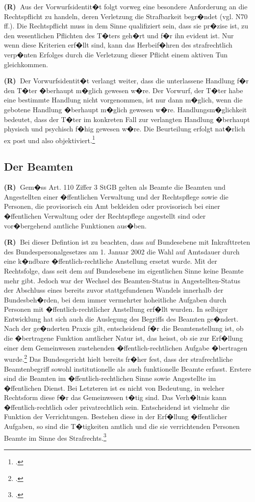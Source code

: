 \documentclass[paper=a4,fontsize=12pt, oneside, numbers=noenddot]{scrbook}
\newcounter{rz}
\newcommand{\Rz}{\addtocounter{rz}{1}\textbf{(R\arabic{rz})~}}
\begin{document}
	\Rz Aus der Vorwurfsidentit�t folgt vorweg eine besondere Anforderung an die Rechtspflicht zu handeln, deren Verletzung die Strafbarkeit begr�ndet (vgl. N70 ff.). Die Rechtspflicht muss in dem Sinne qualifiziert sein, dass sie pr�zise ist, zu den wesentlichen Pflichten des T�ters geh�rt und f�r ihn evident ist. Nur wenn diese Kriterien erf�llt sind, kann das Herbeif�hren des strafrechtlich verp�nten Erfolges durch die Verletzung dieser Pflicht einem aktiven Tun gleichkommen.

\Rz Der Vorwurfsidentit�t verlangt weiter, dass die unterlassene Handlung f�r den T�ter �berhaupt m�glich gewesen w�re. Der Vorwurf, der T�ter habe eine bestimmte Handlung nicht vorgenommen, ist nur dann m�glich, wenn die gebotene Handlung �berhaupt m�glich gewesen w�re. Handlungsm�glichkeit bedeutet, dass der T�ter im konkreten Fall zur verlangten Handlung �berhaupt physisch und psychisch f�hig gewesen w�re. Die Beurteilung erfolgt nat�rlich ex post und also objektiviert.\footcite[Art. 11, Rz 120]{2019:Niggli:BSKStGB}



	
	\subsection{Der Beamten}\label{Recht:Beamte}
	\Rz Gem�ss Art. 110 Ziffer 3 StGB gelten als Beamte die Beamten und Angestellten einer �ffentlichen Verwaltung und der Rechtspflege sowie die Personen, die provisorisch ein Amt bekleiden oder provisorisch bei einer �ffentlichen Verwaltung oder der Rechtspflege angestellt sind oder vor�bergehend amtliche Funktionen aus�ben. 
	
	\Rz Bei dieser Defintion ist zu beachten, dass auf Bundesebene mit Inkrafttreten des Bundespersonalgesetzes am 1. Januar 2002 die Wahl auf Amtsdauer durch eine k�ndbare �ffentlich-rechtliche Anstellung ersetzt wurde. Mit der Rechtsfolge, dass seit dem auf Bundesebene im eigentlichen Sinne keine Beamte mehr gibt. Jedoch war der Wechsel des Beamten-Status in Angestellten-Status der Abschluss eines bereits zuvor stattgefundenen Wandels innerhalb der Bundesbeh�rden, bei dem immer vermehrter hoheitliche Aufgaben durch Personen mit �ffentlich-rechtlicher Anstellung erf�llt wurden. In selbiger Entwicklung hat sich auch die Auslegung des Begriffs des Beamten ge�ndert. Nach der ge�nderten Praxis gilt, entscheidend f�r die Beamtenstellung ist, ob die �bertragene Funktion amtlicher Natur ist, das heisst, ob sie zur Erf�llung einer dem Gemeinwesen zustehenden �ffentlich-rechtlichen Aufgabe �bertragen wurde.\footcite[Erw. 1.3]{BGE141IV329} Das Bundesgericht hielt bereits fr�her fest, dass der strafrechtliche Beamtenbegriff sowohl institutionelle als auch funktionelle Beamte erfasst. Erstere sind die Beamten im �ffentlich-rechtlichen Sinne sowie Angestellte im �ffentlichen Dienst. Bei Letzteren ist es nicht von Bedeutung, in welcher Rechtsform diese f�r das Gemeinwesen t�tig sind. Das Verh�ltnis kann �ffentlich-rechtlich oder privatrechtlich sein. Entscheidend ist vielmehr die Funktion der Verrichtungen. Bestehen diese in der Erf�llung �ffentlicher Aufgaben, so sind die T�tigkeiten amtlich und die sie verrichtenden Personen Beamte im Sinne des Strafrechts.\footcite{BGE135IV198}
	
\end{document}
